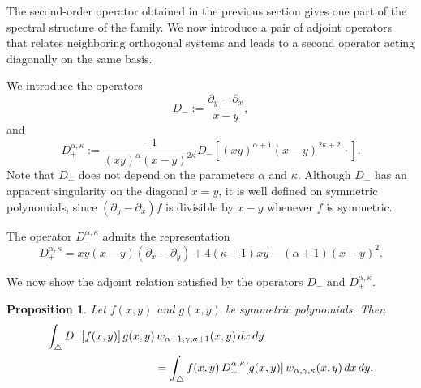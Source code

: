 \documentclass[reqno,10pt]{amsart}
\theoremstyle{plain}
\newtheorem{proposition}[theorem]{Proposition}
\numberwithin{equation}{section}
\numberwithin{figure}{section}
\begin{document}
The second-order operator obtained in the previous section gives one part of
the spectral structure of the family. We now introduce a pair of adjoint
operators that relates neighboring orthogonal systems and leads to a second
operator acting diagonally on the same basis.

We introduce the operators
\begin{equation}\label{Dminus_agk}
D_{-}
:=
\frac{\partial_y-\partial_x}{x-y},
\end{equation}
and
\begin{equation}\label{Dplus_agk}
D_{+}^{\alpha,\kappa}
:=
\frac{-1}{(xy)^\alpha (x-y)^{2\kappa}}
D_{-}\left[
(xy)^{\alpha+1}(x-y)^{2\kappa+2}\,\cdot
\right].
\end{equation}
Note that $D_{-}$ does not depend on the parameters
$\alpha$ and $\kappa$. Although $D_{-}$ has an apparent
singularity on the diagonal $x=y$, it is well defined on symmetric
polynomials, since $(\partial_y-\partial_x)f$ is divisible by $x-y$
whenever $f$ is symmetric.

The operator $D_{+}^{\alpha,\kappa}$ admits the representation
\begin{equation}\label{Dplus_agk_expanded}
D_{+}^{\alpha,\kappa}
=
xy(x-y)(\partial_x-\partial_y)
+
4(\kappa+1)xy
-
(\alpha+1)(x-y)^2 .
\end{equation}

We now show the adjoint relation satisfied by the operators $D_{-}$ and
$D_{+}^{\alpha,\kappa}$.

\begin{proposition}\label{prop:D_adjoints_agk}
Let $f(x,y)$ and $g(x,y)$ be symmetric polynomials. Then
\begin{align*}
\int_{\triangle}
D_{-}[f(x,y)]\,g(x,y)&\,
w_{\alpha+1,\gamma,\kappa+1}(x,y)\,dx\,dy
\notag\\
& =
\int_{\triangle}
f(x,y)\,D_{+}^{\alpha,\kappa}[g(x,y)]\,
w_{\alpha,\gamma,\kappa}(x,y)\,dx\,dy .
\end{align*}
\end{proposition}
\end{document}
